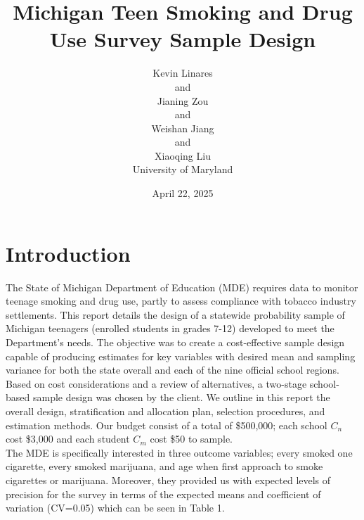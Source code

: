 \documentclass[
  12pt]{article}
\begin{document}
\def\spacingset#1{\renewcommand{\baselinestretch}%
{#1}\small\normalsize} \spacingset{1}



\date{April 22, 2025}
\title{\bf Michigan Teen Smoking and Drug Use Survey Sample Design}
\author{
Kevin Linares\\
and\\Jianing Zou\\
and\\Weishan Jiang\\
and\\Xiaoqing Liu\\
University of Maryland\\
}
\maketitle

\bigskip
\bigskip
\begin{abstract}

\end{abstract}


\newpage
\spacingset{1.9} %


\section{Introduction}\label{sec-intro}

The State of Michigan Department of Education (MDE) requires data to
monitor teenage smoking and drug use, partly to assess compliance with
tobacco industry settlements. This report details the design of a
statewide probability sample of Michigan teenagers (enrolled students in
grades 7-12) developed to meet the Department's needs. The objective was
to create a cost-effective sample design capable of producing estimates
for key variables with desired mean and sampling variance for both the
state overall and each of the nine official school regions. Based on
cost considerations and a review of alternatives, a two-stage
school-based sample design was chosen by the client. We outline in this
report the overall design, stratification and allocation plan, selection
procedures, and estimation methods. Our budget consist of a total of
\$500,000; each school \(C_n\) cost \$3,000 and each student \(C_m\)
cost \$50 to sample.\\

The MDE is specifically interested in three outcome variables; every
smoked one cigarette, every smoked marijuana, and age when first
approach to smoke cigarettes or marijuana. Moreover, they provided us
with expected levels of precision for the survey in terms of the
expected means and coefficient of variation (CV=0.05) which can be seen
in Table 1.
\end{document}
